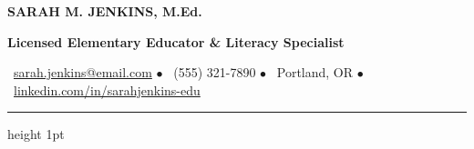 \documentclass[10pt,letterpaper]{article}
\begin{document}
\begin{center}
  {\Huge\bfseries\color{dark} SARAH M. JENKINS, M.Ed.}\par\vspace{0.15cm}
  {\large\bfseries\color{accent} Licensed Elementary Educator \& Literacy Specialist}\par\vspace{0.25cm}
  {\color{light}\small
    \faEnvelope\ \href{mailto:sarah.jenkins@email.com}{sarah.jenkins@email.com} \quad $\bullet$ \quad
    \faPhone\ (555) 321-7890 \quad $\bullet$ \quad
    \faMapMarker\ Portland, OR \quad $\bullet$ \quad
    \faLinkedin\ \href{https://linkedin.com/in/sarahjenkins-edu}{linkedin.com/in/sarahjenkins-edu}
  }
\end{center}
\vspace{0.15cm}
{\color{linecolor}\hrule height 1pt}
\vspace{0.3cm}
\end{document}
